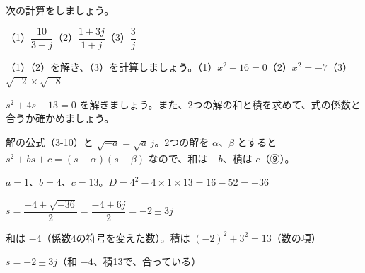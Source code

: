 \noindent\begin{minipage}[t]{0.485\linewidth}\vspace{0pt}
\begin{jibun}
次の計算をしましょう。\par
（1）$\dfrac{10}{3-j}$\newline（2）$\dfrac{1+3j}{1+j}$\newline（3）$\dfrac{3}{j}$
\end{jibun}
\end{minipage}\hfill
\begin{minipage}[t]{0.485\linewidth}\vspace{0pt}
\begin{jibun}
（1）（2）を解き、（3）を計算しましょう。\newline（1）$x^2+16=0$\newline（2）$x^2=-7$\newline（3）$\sqrt{-2}\times\sqrt{-8}$
\end{jibun}
\end{minipage}

\begin{reidai}
$s^2+4s+13=0$ を解きましょう。また、2つの解の和と積を求めて、式の係数と合うか確かめましょう。\par
\kangaekata 解の公式（3-10）と $\sqrt{-a}=\sqrt a\,j$。2つの解を $\alpha$、$\beta$ とすると $s^2+bs+c=(s-\alpha)(s-\beta)$ なので、和は $-b$、積は $c$（⑨）。\par
\shiki{}\zw{} $a=1$、$b=4$、$c=13$。$D=4^2-4\times1\times13=16-52=-36$\par
\bkviia $s=\dfrac{-4\pm\sqrt{-36}}{2}=\dfrac{-4\pm6j}{2}=-2\pm3j$\par
\bkviia 和は $-4$（係数4の符号を変えた数）。積は $(-2)^2+3^2=13$（数の項）\par
\kotae{}\zw{} $s=-2\pm3j$（和 $-4$、積13で、合っている）
\end{reidai}

